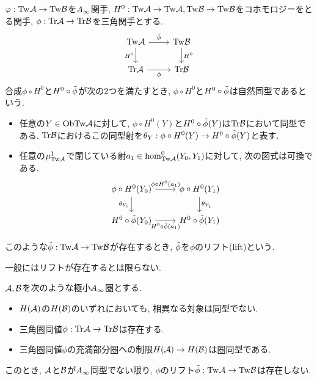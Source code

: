 \documentclass[uplatex, a4paper, 14Q, dvipdfmx]{jsarticle}
\begin{document}
\begin{definition}[リフト] \label{def_lift}
  $\varphi : \mathrm{Tw}\mathcal{A} \to \mathrm{Tw}\mathcal{B}$を$A_{\infty}$関手, $H^0 : \mathrm{Tw}\mathcal{A} \to \mathrm{Tw}\mathcal{A}, \mathrm{Tw}\mathcal{B} \to \mathrm{Tw}\mathcal{B}$をコホモロジーをとる関手, $\phi : \mathrm{Tr}\mathcal{A} \to \mathrm{Tr}\mathcal{B}$を三角関手とする. 
  \[\begin{tikzcd}
    \Tw\A & \Tw\B \\
    \Tr\A & \Tr\B
    \arrow["\tilphi", from=1-1, to=1-2]
    \arrow["{H^0}", from=1-2, to=2-2]
    \arrow["{H^0}"', from=1-1, to=2-1]
    \arrow["\phi"', from=2-1, to=2-2]
  \end{tikzcd}\]
  合成$\phi \circ H^0$と$H^0 \circ \tilde{\phi}$が次の2つを満たすとき, $\phi \circ H^0$と$H^0 \circ \tilde{\phi}$は自然同型であるという. 
  \begin{itemize}
    \item 任意の$Y \in \mathrm{Ob}\mathrm{Tw}\mathcal{A}$に対して, $\phi \circ H^0(Y)$と$H^0 \circ \tilde{\phi}(Y)$は$\mathrm{Tr}\mathcal{B}$において同型である. 
    $\mathrm{Tr}\mathcal{B}$におけるこの同型射を$\theta_Y : \phi \circ H^0(Y) \to H^0 \circ \tilde{\phi}(Y)$と表す.
    \item 任意の$\mu^1_{\mathrm{Tw}\mathcal{A}}$で閉じている射$a_1 \in \hom_{\mathrm{Tw}\mathcal{A}}^0 (Y_0,Y_1)$に対して, 次の図式は可換である. 
    \[\begin{tikzcd}
      \phi \circ H^0(Y_0) & \phi \circ H^0(Y_1) \\
      H^0 \circ \tilphi(Y_0) & H^0 \circ \tilphi(Y_1)
      \arrow["{\phi \circ H^0(a_1)}", from=1-1, to=1-2]
      \arrow["{\theta_{Y_0}}"', from=1-1, to=2-1]
      \arrow["{\theta_{Y_1}}", from=1-2, to=2-2]
      \arrow["{H^0 \circ \tilphi(a_1)}"', from=2-1, to=2-2]
    \end{tikzcd}\]
  \end{itemize}
  このような$\tilde{\phi} : \mathrm{Tw}\mathcal{A} \to \mathrm{Tw}\mathcal{B}$が存在するとき, $\tilde{\phi}$を$\phi$のリフト(lift)という.
\end{definition}

  

一般にはリフトが存在するとは限らない.

\begin{remark}
  $\mathcal{A}, \mathcal{B}$を次のような極小$A_{\infty}$圏とする.
  \begin{itemize}
    \item $H(\mathcal{A})$の$H(\mathcal{B})$のいずれにおいても, 相異なる対象は同型でない. 
    \item 三角圏同値$\phi : \mathrm{Tr}\mathcal{A} \to \mathrm{Tr}\mathcal{B}$は存在する.
    \item 三角圏同値$\phi$の充満部分圏への制限$H(\mathcal{A}) \to H(\mathcal{B})$は圏同型である.
  \end{itemize}
  このとき, $\mathcal{A}$と$\mathcal{B}$が$A_{\infty}$同型でない限り, $\phi$のリフト$\tilde{\phi} : \mathrm{Tw}\mathcal{A} \to \mathrm{Tw}\mathcal{B}$は存在しない.
\end{remark}
\end{document}
